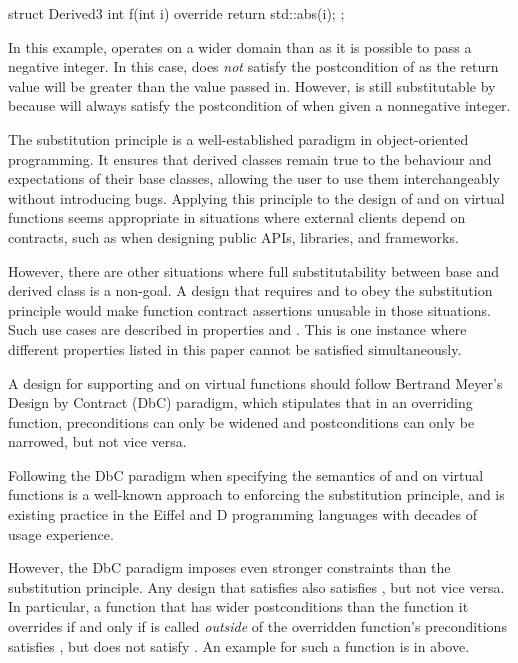 \begin{codeblock}
struct Derived3 {
  int f(int i) override {
    return std::abs(i);
  }
};
\end{codeblock}
In this example,  operates on a wider domain than  as it is possible to pass a negative integer. In this case,   does \emph{not} satisfy the postcondition of  as the return value will be greater than the value passed in. However,  is still substitutable by  because  will always satisfy the postcondition of  when given a nonnegative integer.

The substitution principle is a well-established paradigm in object-oriented programming. It ensures that derived classes remain true to the behaviour and expectations of their base classes, allowing the user to use them interchangeably without introducing bugs. Applying this principle to the design of  and  on virtual functions seems appropriate in situations where external clients depend on contracts, such as when designing public APIs, libraries, and frameworks.

However, there are other situations where full substitutability between base and derived class is a non-goal. A design that requires  and  to obey the substitution principle would make function contract assertions unusable in those situations. Such use cases are described in properties  and . This is one instance where different properties listed in this paper  cannot be satisfied simultaneously.


A design for supporting  and  on virtual functions should follow Bertrand Meyer's Design by Contract (DbC) paradigm, which stipulates that in an overriding function, preconditions can only be widened and postconditions can only be narrowed, but not vice versa.

Following the DbC paradigm when  specifying the semantics of  and  on virtual functions is a well-known approach to enforcing the substitution principle, and is existing practice in the Eiffel and D programming languages with decades of usage experience.

However, the DbC paradigm imposes even stronger constraints than the substitution principle. Any design that satisfies  also satisfies , but not vice versa. In particular, a function that has wider postconditions than the function it overrides if and only if is called \emph{outside} of the overridden function's preconditions satisfies , but does not satisfy . An example for such a function is  in  above.

